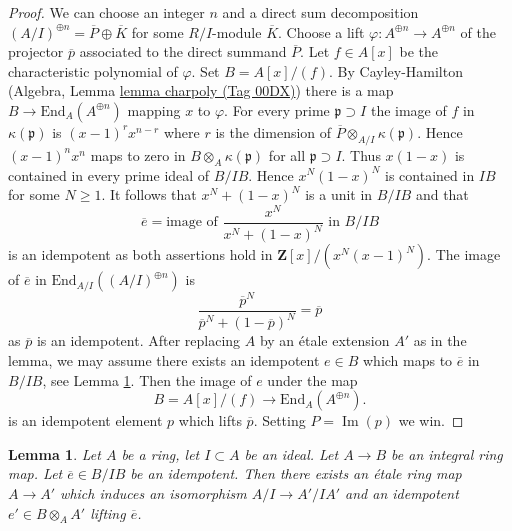 \documentclass{amsart}
\theoremstyle{plain}
\newtheorem{lemma}[subsection]{Lemma}
\theoremstyle{definition}
\theoremstyle{remark}
\numberwithin{equation}{subsection}
\def\Im{\mathop{\mathrm{Im}}}
\begin{document}
\begin{proof}
We can choose an integer $n$ and a direct sum decomposition
$(A/I)^{\oplus n} = \overline{P} \oplus \overline{K}$
for some $R/I$-module $\overline{K}$. Choose a lift
$\varphi : A^{\oplus n} \to A^{\oplus n}$ of the projector $\overline{p}$
associated to the direct summand $\overline{P}$.
Let $f \in A[x]$ be the characteristic polynomial of $\varphi$.
Set $B = A[x]/(f)$. By Cayley-Hamilton
(Algebra, Lemma \href{https://stacks.math.columbia.edu/tag/00DX}{lemma charpoly (Tag 00DX)}) there is a map
$B \to \text{End}_A(A^{\oplus n})$ mapping $x$ to $\varphi$.
For every prime $\mathfrak p \supset I$ the image of $f$ in
$\kappa(\mathfrak p)$ is $(x - 1)^rx^{n - r}$ where $r$ is the
dimension of $\overline{P} \otimes_{A/I} \kappa(\mathfrak p)$.
Hence $(x - 1)^nx^n$ maps to zero in $B \otimes_A \kappa(\mathfrak p)$
for all $\mathfrak p \supset I$. Thus $x(1 - x)$ is contained
in every prime ideal of $B/IB$. Hence $x^N(1 - x)^N$ is
contained in $IB$ for some $N \geq 1$.
It follows that $x^N + (1 - x)^N$ is a unit in $B/IB$ and that
$$
\overline{e} = \text{image of }\frac{x^N}{x^N + (1 - x)^N}\text{ in }B/IB
$$
is an idempotent as both assertions hold in $\mathbf{Z}[x]/(x^N(x - 1)^N)$.
The image of $\overline{e}$ in $\text{End}_{A/I}((A/I)^{\oplus n})$ is
$$
\frac{\overline{p}^N}{\overline{p}^N + (1 - \overline{p})^N} = \overline{p}
$$
as $\overline{p}$ is an idempotent. After replacing $A$ by an \'etale
extension $A'$ as in the lemma, we may assume there exists an idempotent
$e \in B$ which maps to $\overline{e}$ in $B/IB$, see
Lemma \ref{more-algebra-lemma-lift-idempotent-upstairs}.
Then the image of $e$ under the map
$$
B = A[x]/(f) \longrightarrow \text{End}_A(A^{\oplus n}).
$$
is an idempotent element $p$ which lifts $\overline{p}$.
Setting $P = \Im(p)$ we win.
\end{proof}


\begin{lemma}
\label{more-algebra-lemma-lift-idempotent-upstairs}
Let $A$ be a ring, let $I \subset A$ be an ideal.
Let $A \to B$ be an integral ring map.
Let $\overline{e} \in B/IB$ be an idempotent.
Then there exists an \'etale ring map $A \to A'$
which induces an isomorphism $A/I \to A'/IA'$ and an idempotent
$e' \in B \otimes_A A'$ lifting $\overline{e}$.
\end{lemma}
\end{document}
